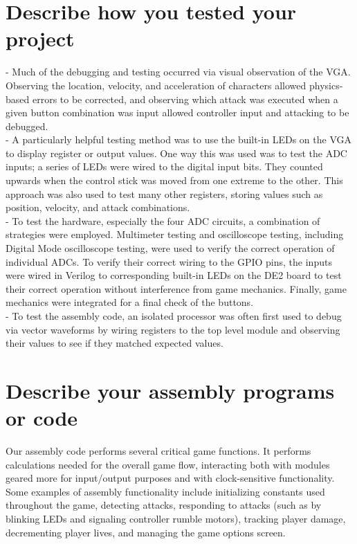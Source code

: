 \documentclass[12pt]{article} %
\begin{document}
\section{Describe how you tested your project}
- Much of the debugging and testing occurred via visual observation of the VGA. Observing the location, velocity, and acceleration of characters allowed physics-based errors to be corrected, and observing which attack was executed when a given button combination was input allowed controller input and attacking to be debugged.\\

-  A particularly helpful testing method was to use the built-in LEDs on the VGA to display register or output values. One way this was used was to test the ADC inputs; a series of LEDs were wired to the digital input bits. They counted upwards when the control stick was moved from one extreme to the other. This approach was also used to test many other registers, storing values such as position, velocity, and attack combinations.\\

- To test the hardware, especially the four ADC circuits, a combination of strategies were employed. Multimeter testing and oscilloscope testing, including Digital Mode oscilloscope testing, were used to verify the correct operation of individual ADCs. To verify their correct wiring to the GPIO pins, the inputs were wired in Verilog to corresponding built-in LEDs on the DE2 board to test their correct operation without interference from game mechanics. Finally, game mechanics were integrated for a final check of the buttons.\\

- To test the assembly code, an isolated processor was often first used to debug via vector waveforms by wiring registers to the top level module and observing their values to see if they matched expected values.\\

\section{Describe your assembly programs or code}
Our assembly code performs several critical game functions. It performs calculations needed for the overall game flow, interacting both with modules geared more for input/output purposes and with clock-sensitive functionality. Some examples of assembly functionality include initializing constants used throughout the game, detecting attacks, responding to attacks (such as by blinking LEDs and signaling controller rumble motors), tracking player damage, decrementing player lives, and managing the game options screen.
\end{document}

